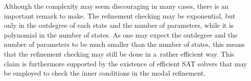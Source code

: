 Although the complexity may seem discouraging in many cases, there is an 
important remark to make. The refinement checking may be exponential,
but only in the outdegree of each state and the number of
parameters, while it is polynomial in the number of states. 
As one may expect the outdegree and the number of parameters to be much smaller
than the number of states, this means that the refinement checking
may still be done in a~rather efficient way. This claim is furthermore
supported by the existence of efficient SAT solvers that may be employed 
to check the inner conditions in the modal refinement.



